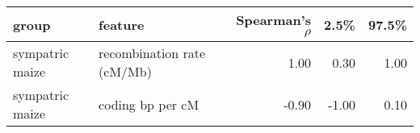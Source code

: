 \begin{table}[ht]
\centering
\begin{tabular}{llrrr}
  \hline
group & feature & Spearman's $\rho$ & 2.5\% & 97.5\% \\ 
  \hline
sympatric maize & recombination rate (cM/Mb) & 1.00 & 0.30 & 1.00 \\ 
  sympatric maize & coding bp per cM & -0.90 & -1.00 & 0.10 \\ 
   \hline
\end{tabular}
\end{table}
